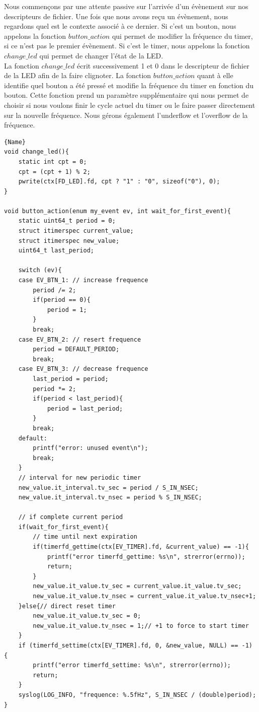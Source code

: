 \documentclass[
	a4paper, %
	10pt, %
]{CSUniSchoolLabReport}
\begin{document}
Nous commençons par une attente passive sur l'arrivée d'un évènement sur nos descripteurs de fichier. Une fois que nous avons reçu un évènement, nous regardons quel est le contexte associé à ce dernier. Si c'est un bouton, nous appelons la fonction $button\_action$ qui permet de modifier la fréquence du timer, si ce n'est pas le premier évènement. Si c'est le timer, nous appelons la fonction $change\_led$ qui permet de changer l'état de la LED.\\
La fonction $change\_led$ écrit successivement 1 et 0 dans le descripteur de fichier de la LED afin de la faire clignoter. La fonction $button\_action$ quant à elle identifie quel bouton a été pressé et modifie la fréquence du timer en fonction du bouton. Cette fonction prend un paramètre supplémentaire qui nous permet de choisir si nous voulons finir le cycle actuel du timer ou le faire passer directement sur la nouvelle fréquence. Nous gérons également l'underflow et l'overflow de la fréquence.
\begin{lstlisting}[style=CStyle, caption=Routine LED et boutton, firstnumber=1]{Name}
void change_led(){
	static int cpt = 0;
	cpt = (cpt + 1) % 2;
	pwrite(ctx[FD_LED].fd, cpt ? "1" : "0", sizeof("0"), 0);
}

void button_action(enum my_event ev, int wait_for_first_event){
	static uint64_t period = 0;
	struct itimerspec current_value;
	struct itimerspec new_value;
	uint64_t last_period;

	switch (ev){
	case EV_BTN_1: // increase frequence
		period /= 2;
		if(period == 0){
			period = 1;
		}
		break;
	case EV_BTN_2: // resert frequence
		period = DEFAULT_PERIOD;
		break;
	case EV_BTN_3: // decrease frequence
		last_period = period;
		period *= 2;
		if(period < last_period){
			period = last_period;
		}
		break;
	default:
		printf("error: unused event\n");
		break;
	}
	// interval for new periodic timer
	new_value.it_interval.tv_sec = period / S_IN_NSEC;
	new_value.it_interval.tv_nsec = period % S_IN_NSEC;
	
	// if complete current period
	if(wait_for_first_event){
		// time until next expiration
		if(timerfd_gettime(ctx[EV_TIMER].fd, &current_value) == -1){
			printf("error timerfd_gettime: %s\n", strerror(errno));
			return;
		}
		new_value.it_value.tv_sec = current_value.it_value.tv_sec;
		new_value.it_value.tv_nsec = current_value.it_value.tv_nsec+1;
	}else{// direct reset timer
		new_value.it_value.tv_sec = 0;
		new_value.it_value.tv_nsec = 1;// +1 to force to start timer
	}
	if (timerfd_settime(ctx[EV_TIMER].fd, 0, &new_value, NULL) == -1) {
		printf("error timerfd_settime: %s\n", strerror(errno));
		return;
	}
	syslog(LOG_INFO, "frequence: %.5fHz", S_IN_NSEC / (double)period);
}
\end{lstlisting}
\end{document}
